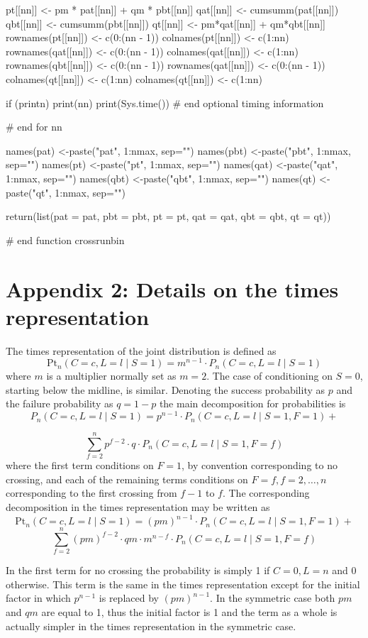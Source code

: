 \begin{example}
{{    pt[[nn]]            <- pm * pat[[nn]] + qm * pbt[[nn]]
    qat[[nn]]           <- cumsumm(pat[[nn]])
    qbt[[nn]]           <- cumsumm(pbt[[nn]])
    qt[[nn]]            <- pm*qat[[nn]] + qm*qbt[[nn]]
    rownames(pt[[nn]])  <- c(0:(nn - 1))
    colnames(pt[[nn]])  <- c(1:nn)
    rownames(qat[[nn]]) <- c(0:(nn - 1))
    colnames(qat[[nn]]) <- c(1:nn)
    rownames(qbt[[nn]]) <- c(0:(nn - 1))
    rownames(qat[[nn]]) <- c(0:(nn - 1))
    colnames(qt[[nn]])  <- c(1:nn)
    colnames(qt[[nn]])  <- c(1:nn)

    if (printn) {
      print(nn)
      print(Sys.time())
    } # end optional timing information
  } # end for nn

  names(pat) <-paste("pat", 1:nmax, sep="")
  names(pbt) <-paste("pbt", 1:nmax, sep="")
  names(pt)  <-paste("pt",  1:nmax, sep="")
  names(qat) <-paste("qat", 1:nmax, sep="")
  names(qbt) <-paste("qbt", 1:nmax, sep="")
  names(qt)  <-paste("qt",  1:nmax, sep="")

  return(list(pat = pat, pbt = pbt, pt = pt, qat = qat, qbt = qbt, qt = qt))
} # end function crossrunbin
\end{example}


\section{Appendix 2: Details on the times representation}

The times representation of the joint distribution is defined as $$\text{Pt}_n ( C=c, L=l \mid S=1 ) = m^{n-1} \cdot P_n ( C=c, L=l \mid S=1 )$$ where $m$ is a multiplier normally set as $m=2$. The case of conditioning on $S=0$, starting below the midline, is similar. Denoting the success probability as $p$ and the failure probability as $q=1-p$ the main decomposition for probabilities is $$P_n ( C=c, L=l \mid S=1) = p^{n-1} \cdot P_n ( C=c, L=l \mid S=1, F=1)+$$

$$ \sum_{f=2}^n p^{f-2} \cdot  q \cdot P_n ( C=c, L=l \mid S=1, F=f)$$
where the first term conditions on $F=1$, by convention corresponding to no crossing, and each of the remaining terms conditions on $F=f, f =2, \ldots , n$ corresponding to the first crossing from $f-1$ to $f$. The corresponding decomposition in the times representation may be written as $$\text{Pt}_n ( C=c, L=l \mid S=1) = (pm)^{n-1} \cdot P_n ( C=c, L=l \mid S=1, F=1) +$$
$$ \sum_{f=2}^n (pm)^{f-2} \cdot  qm \cdot m^{n-f} \cdot P_n ( C=c, L=l \mid S=1, F=f)$$

In the first term for no crossing the probability is simply 1 if $C=0, L=n$ and 0 otherwise. This term is the same in the times representation except for the initial factor in which $p^{n-1}$ is replaced by $(pm)^{n-1}$. In the symmetric case both $pm$ and $qm$ are equal to 1, thus the initial factor is 1 and the term as a whole is actually simpler in the times representation in the symmetric case.

